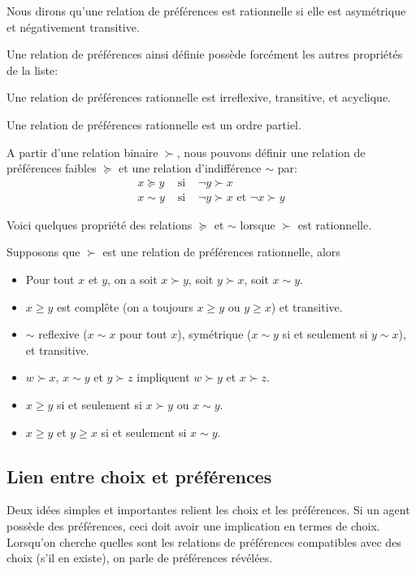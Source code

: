 \begin{definition}
Nous dirons qu'une relation de préférences est rationnelle si elle
est asymétrique et négativement transitive.
\end{definition}
Une relation de préférences ainsi définie possède forcément les
autres propriétés de la liste:
\begin{proposition}\label{rationelleimpliquelereste}
Une relation de préférences rationnelle est irreflexive,
transitive, et acyclique.
\end{proposition}
Une relation de préférences rationnelle est un ordre partiel.

A partir d'une relation binaire $\succ$, nous pouvons définir une
relation de préférences faibles $\succeq$  et une relation
d'indifférence $\sim$ par:
\begin{eqnarray*}
x\succeq y &\mbox{\ si\ }& \neg y\succ x \\
x\sim y &\mbox{\ si\ }& \neg y\succ x\mbox{\ et\ } \neg x\succ y %
\end{eqnarray*}

Voici quelques propriété des relations $\succeq$ et $\sim$ lorsque
$\succ$ est rationnelle.

\begin{proposition}
Supposons que $\succ$ est une relation de préférences rationnelle,
alors
\begin{itemize}
\item Pour tout $x$ et $y$, on a soit $x\succ y$, soit $y\succ x$,
soit $x\sim y$.%
\item $x\geq y$ est compl\^ete (on a toujours $x\geq y$ ou $y\geq
x$) et transitive. %
\item $\sim$ reflexive ($x\sim x$ pour tout $x$), symétrique
($x\sim y$ si et seulement si $y\sim x$), et transitive. %
\item $w\succ x$, $x\sim y$ et $y\succ z$ impliquent $w\succ y$ et
$x\succ z$.%
\item $x\geq y$ si et seulement si $x\succ y$ ou $x\sim y$. %
\item $x\geq y$ et $y\geq x$ si et seulement si $x\sim y$.
\end{itemize}
\end{proposition}

\subsection{Lien entre choix et préférences}
Deux idées simples et importantes relient les choix et les
préférences. Si un agent possède des préférences, ceci doit avoir
une implication en termes de choix. Lorsqu'on cherche quelles sont
les relations de préférences compatibles avec des choix (s'il en
existe), on parle de préférences révélées.

